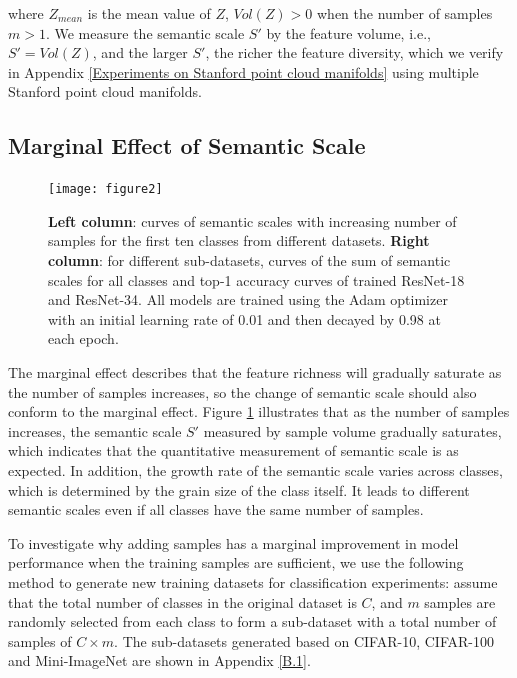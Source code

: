 \documentclass[10pt]{article} %
\begin{document}
where $Z_{mean}$ is the mean value of $Z$, $V\!ol( Z )>0$ when the number of samples $m>1$. We measure the semantic scale $S'$ by the feature volume, i.e., $S' = V\!ol( Z )$, and the larger $S'$, the richer the feature diversity, which we verify in Appendix \ref{Experiments on Stanford point cloud manifolds} using multiple Stanford point cloud manifolds. 

\subsection{Marginal Effect of Semantic Scale\label{3.3}}

\begin{figure} %
\begin{center}
\vskip -0.32in
\texttt{[image: figure2]}
\vskip -0.14in
\caption{\textbf{Left column}: curves of semantic scales with increasing number of samples for the first ten classes from different datasets. \textbf{Right column}: for different sub-datasets, curves of the sum of semantic scales for all classes and top-1 accuracy curves of trained ResNet-18 and ResNet-34. All models are trained using the Adam optimizer \cite {paper33} with an initial learning rate of 0.01 and then decayed by 0.98 at each epoch.}
\label{fig2}
\end{center}
\end{figure}

The marginal effect describes that the feature richness will gradually saturate as the number of samples increases, so the change of semantic scale should also conform to the marginal effect. Figure \ref{fig2} illustrates that as the number of samples increases, the semantic scale $S'$ measured by sample volume gradually saturates, which indicates that the quantitative measurement of semantic scale is as expected. In addition, the growth rate of the semantic scale varies across classes, which is determined by the grain size of the class itself. It leads to different semantic scales even if all classes have the same number of samples.

To investigate why adding samples has a marginal improvement in model performance when the training samples are sufficient, we use the following method to generate new training datasets for classification experiments: assume that the total number of classes in the original dataset is $C$, and $m$ samples are randomly selected from each class to form a sub-dataset with a total number of samples of $C \times m$. The sub-datasets generated based on CIFAR-10, CIFAR-100 \cite {paper28} and Mini-ImageNet \cite {paper31} are shown in Appendix \ref{B.1}.
\end{document}
